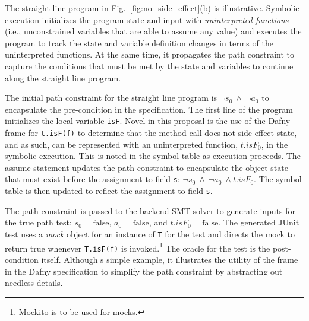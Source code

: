 \documentclass[11pt,onecolumn,notitlepage]{article}
\newcommand{\figref}[1]{Fig.~\ref{#1}}
\begin{document}
The straight line program in \figref{fig:no_side_effect}(b) is illustrative. Symbolic execution initializes the program state and input with \emph{uninterpreted functions} (i.e., unconstrained variables that are able to assume any value) and executes the program to track the state and variable definition changes in terms of the uninterpreted functions. At the same time, it propagates the path constraint to capture the conditions that must be met by the state and variables to continue along the straight line program.

The initial path constraint for the straight line program is $\neg s_0\ \wedge\ \neg a_0$ to encapsulate the pre-condition in the specification. The first line of the program initializes the local variable \texttt{isF}. Novel in this proposal is the use of the Dafny frame for \texttt{t.isF(f)} to determine that the method call does not side-effect state, and as such, can be represented with an uninterpreted function, $\mathit{t.isF}_0$, in the symbolic execution. This is noted in the symbol table as execution proceeds. The assume statement updates the path constraint to encapsulate the object state that must exist before the assignment to field \texttt{s}: $\neg s_0\ \wedge\ \neg a_0\ \wedge \mathit{t.isF}_0$. The symbol table is then updated to reflect the assignment to field \texttt{s}.

The path constraint is passed to the backend SMT solver to generate inputs for the true path test: $s_0 = \mathrm{false}$, $a_0 = \mathrm{false}$, and $\mathit{t.isF}_0 = \mathrm{false}$. The generated JUnit test uses a \emph{mock} object for an instance of \texttt{T} for the test and directs the mock to return true whenever \texttt{T.isF(f)} is invoked.\footnote{Mockito is to be used for mocks.} The oracle for the test is the post-condition itself. Although s simple example, it illustrates the utility of the frame in the Dafny specification to simplify the path constraint by abstracting out needless details. 
\end{document}

